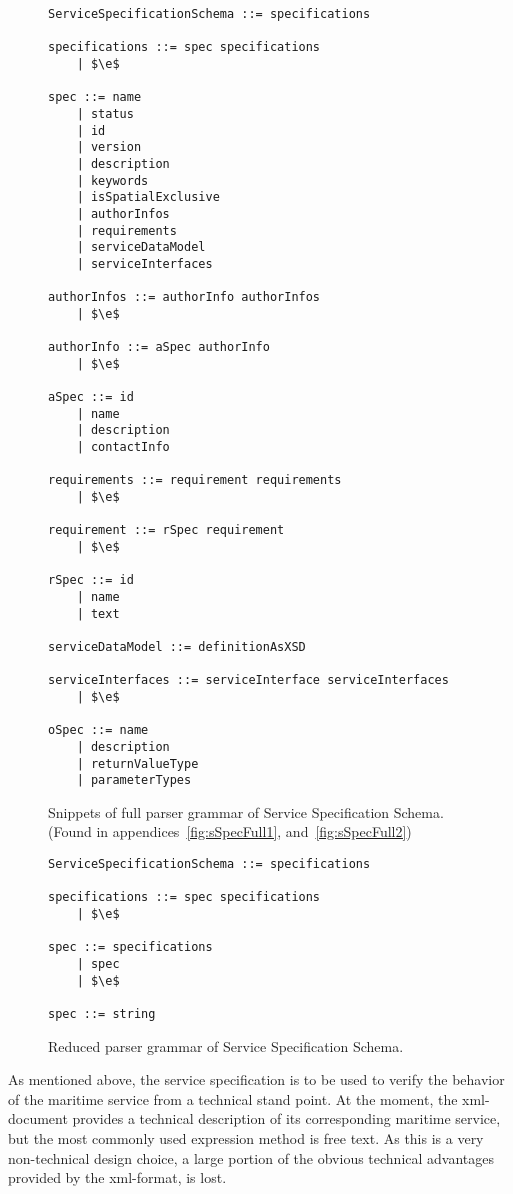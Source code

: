\begin{figure}
	\centering
	\begin{lstlisting}[keywordstyle={}]
ServiceSpecificationSchema ::= specifications

specifications ::= spec specifications
    | $\e$
     
spec ::= name
    | status
    | id
    | version
    | description
    | keywords
    | isSpatialExclusive
    | authorInfos
    | requirements
    | serviceDataModel
    | serviceInterfaces
     
authorInfos ::= authorInfo authorInfos
    | $\e$

authorInfo ::= aSpec authorInfo
    | $\e$

aSpec ::= id
    | name
    | description
    | contactInfo

requirements ::= requirement requirements
    | $\e$

requirement ::= rSpec requirement
    | $\e$

rSpec ::= id
    | name
    | text

serviceDataModel ::= definitionAsXSD

serviceInterfaces ::= serviceInterface serviceInterfaces
    | $\e$

oSpec ::= name
    | description
    | returnValueType
    | parameterTypes
	\end{lstlisting}
	\caption{Snippets of full parser grammar of Service Specification Schema. (Found in appendices~\ref{fig:sSpecFull1}, and~\ref{fig:sSpecFull2})}
	\label{fig:sSpecFull}
\end{figure}

\begin{figure}
	\centering
	\begin{lstlisting}[keywordstyle={}]
ServiceSpecificationSchema ::= specifications

specifications ::= spec specifications
    | $\e$
     
spec ::= specifications
    | spec
    | $\e$

spec ::= string
	\end{lstlisting}
	\caption{Reduced parser grammar of Service Specification Schema.}
	\label{fig:sSpecRed}
\end{figure}

As mentioned above, the service specification is to be used to verify the behavior of the maritime service from a technical stand point. At the moment, the xml-document provides a technical description of its corresponding maritime service, but the most commonly used expression method is free text. As this is a very non-technical design choice, a large portion of the obvious technical advantages provided by the xml-format, is lost. 

